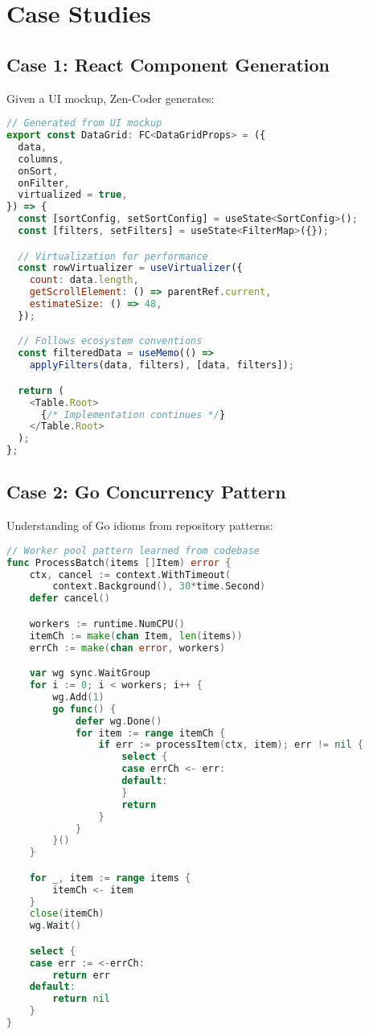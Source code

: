 \documentclass[11pt,a4paper]{article}
\begin{document}
\section{Case Studies}

\subsection{Case 1: React Component Generation}
Given a UI mockup, Zen-Coder generates:
\begin{lstlisting}[language=JavaScript]
// Generated from UI mockup
export const DataGrid: FC<DataGridProps> = ({
  data,
  columns,
  onSort,
  onFilter,
  virtualized = true,
}) => {
  const [sortConfig, setSortConfig] = useState<SortConfig>();
  const [filters, setFilters] = useState<FilterMap>({});

  // Virtualization for performance
  const rowVirtualizer = useVirtualizer({
    count: data.length,
    getScrollElement: () => parentRef.current,
    estimateSize: () => 48,
  });

  // Follows ecosystem conventions
  const filteredData = useMemo(() =>
    applyFilters(data, filters), [data, filters]);

  return (
    <Table.Root>
      {/* Implementation continues */}
    </Table.Root>
  );
};
\end{lstlisting}

\subsection{Case 2: Go Concurrency Pattern}
Understanding of Go idioms from repository patterns:
\begin{lstlisting}[language=Go]
// Worker pool pattern learned from codebase
func ProcessBatch(items []Item) error {
    ctx, cancel := context.WithTimeout(
        context.Background(), 30*time.Second)
    defer cancel()

    workers := runtime.NumCPU()
    itemCh := make(chan Item, len(items))
    errCh := make(chan error, workers)

    var wg sync.WaitGroup
    for i := 0; i < workers; i++ {
        wg.Add(1)
        go func() {
            defer wg.Done()
            for item := range itemCh {
                if err := processItem(ctx, item); err != nil {
                    select {
                    case errCh <- err:
                    default:
                    }
                    return
                }
            }
        }()
    }

    for _, item := range items {
        itemCh <- item
    }
    close(itemCh)
    wg.Wait()

    select {
    case err := <-errCh:
        return err
    default:
        return nil
    }
}
\end{lstlisting}
\end{document}

